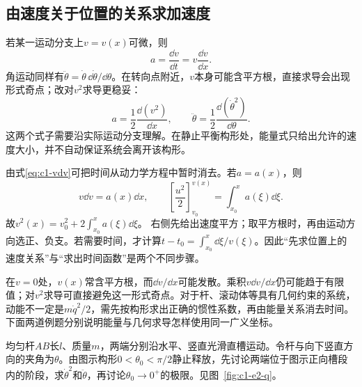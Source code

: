 \subsection{由速度关于位置的关系求加速度}
若某一运动分支上$v=v(x)$可微，则
\begin{equation}\label{eq:c1-vdv}a=\frac{\dd v}{\dd t}=v\frac{\dd v}{\dd x}.
\end{equation}
角运动同样有$\ddot\theta=\dot\theta\,\dd\dot\theta/\dd\theta$。在转向点附近，$v$本身可能含平方根，直接求导会出现形式奇点；改对$v^2$求导更稳妥：
\[a=\frac12\frac{\dd(v^2)}{\dd x},\qquad
\ddot\theta=\frac12\frac{\dd(\dot\theta^2)}{\dd\theta}.\]
这两个式子需要沿实际运动分支理解。在静止平衡构形处，能量式只给出允许的速度大小，并不自动保证系统会离开该构形。

由式\eqref{eq:c1-vdv}可把时间从动力学方程中暂时消去。若$a=a(x)$，则
\[v\dd v=a(x)\dd x,\qquad
\left[\frac{u^2}{2}\right]_{v_0}^{v(x)}
=\int_{x_0}^{x}a(\xi)\dd\xi.\]
故$v^2(x)=v_0^2+2\int_{x_0}^{x}a(\xi)\dd\xi$。
右侧先给出速度平方；取平方根时，再由运动方向选正、负支。若需要时间，才计算$t-t_0=\int_{x_0}^{x}\dd\xi/v(\xi)$。因此“先求位置上的速度关系”与“求出时间函数”是两个不同步骤。

在$v=0$处，$v(x)$常含平方根，而$\dd v/\dd x$可能发散。乘积$v\dd v/\dd x$仍可能趋于有限值；对$v^2$求导可直接避免这一形式奇点。对于杆、滚动体等具有几何约束的系统，动能不一定是$m\dot q^2/2$，需先按构形求出正确的惯性系数，再由能量关系消去时间。下面两道例题分别说明能量与几何求导怎样使用同一广义坐标。

\begin{example}[两端沿光滑直槽运动的杆]\label{ex:c1-e2}
均匀杆$AB$长$l$、质量$m$，两端分别沿水平、竖直光滑直槽运动。令杆与向下竖直方向的夹角为$\theta$。由图示构形$0<\theta_0<\pi/2$静止释放，先讨论两端位于图示正向槽段内的阶段，求$\dot\theta^2$和$\ddot\theta$，再讨论$\theta_0\to0^+$的极限。见图~\ref{fig:c1-e2-q}。
\end{example}

